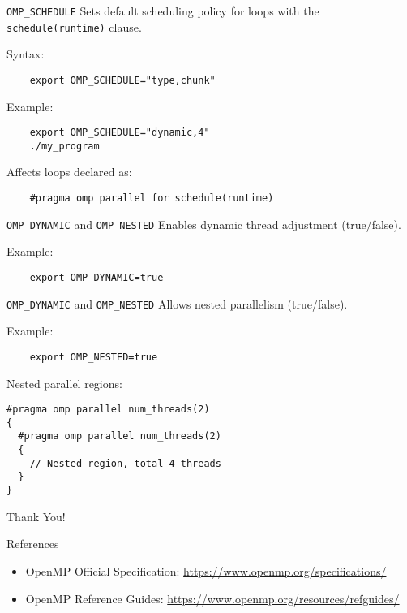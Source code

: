 \documentclass{beamer}
\begin{document}
\begin{frame}[fragile]{\texttt{OMP\_SCHEDULE}}
  Sets default scheduling policy for loops with the \texttt{schedule(runtime)} clause.

  Syntax:
  \begin{verbatim}
    export OMP_SCHEDULE="type,chunk"
  \end{verbatim}

  Example:
  \begin{verbatim}
    export OMP_SCHEDULE="dynamic,4"
    ./my_program
  \end{verbatim}

  Affects loops declared as:
  \begin{verbatim}
    #pragma omp parallel for schedule(runtime)
  \end{verbatim}
\end{frame}

\begin{frame}[fragile]{\texttt{OMP\_DYNAMIC} and \texttt{OMP\_NESTED}}
  Enables dynamic thread adjustment (true/false).

  Example:
  \begin{verbatim}
    export OMP_DYNAMIC=true
  \end{verbatim}
\end{frame}


\begin{frame}[fragile]{\texttt{OMP\_DYNAMIC} and \texttt{OMP\_NESTED}}
  Allows nested parallelism (true/false).

  Example:
  \begin{verbatim}
    export OMP_NESTED=true
  \end{verbatim}

  Nested parallel regions:
  \lstset{style=CStyle}
  \begin{lstlisting}
#pragma omp parallel num_threads(2)
{
  #pragma omp parallel num_threads(2)
  {
    // Nested region, total 4 threads
  }
}
  \end{lstlisting}
\end{frame}

\begin{frame}
  \centering
  \Huge{Thank You!}
\end{frame}

\begin{frame}{References}
  \begin{itemize}
    \item OpenMP Official Specification: \url{https://www.openmp.org/specifications/}
    \item OpenMP Reference Guides: \url{https://www.openmp.org/resources/refguides/}
  \end{itemize}
\end{frame}
\end{document}
